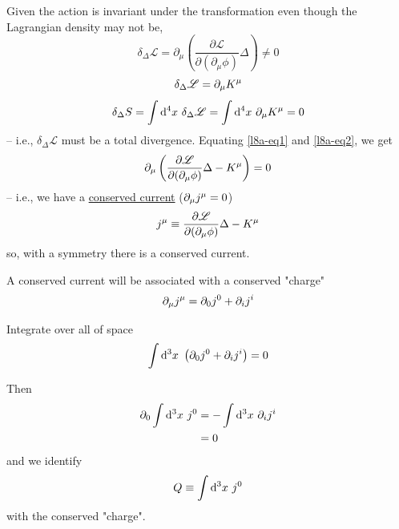 \documentclass{article}
\begin{document}
\noindent Given the action is invariant under the transformation even though the \linebreak Lagrangian density may not be,
\begin{equation} \label{l8a-eq1}
    \delta_\Delta \mathscr{L} = \partial_\mu \left( \dfrac{ \partial \mathscr{L} }{ \partial ( \partial_\mu \phi ) } \Delta \right) \neq 0
\end{equation} %
\begin{equation} \label{l8a-eq2}
    \delta_\Delta \mathscr{L} = \partial_\mu \tensor{K}{^\mu}
\end{equation} %
\begin{equation*}
    \delta_\Delta S = \int \mathrm{d}^4 x~ \delta_\Delta \mathscr{L} = \int \mathrm{d}^4 x~ \partial_\mu \tensor{K}{^\mu} = 0
\end{equation*}
-- i.e., $\delta_\Delta \mathscr{L}$ must be a total divergence. Equating \eqref{l8a-eq1} and \eqref{l8a-eq2}, we get
\begin{equation*}
    \partial_\mu \left( \dfrac{ \partial \mathscr{L} }{ \partial ( \partial_\mu \phi ) } \Delta - \tensor{K}{^\mu} \right) = 0
\end{equation*}
-- i.e., we have a \underline{conserved current} ($\partial_\mu \tensor{j}{^\mu} = 0$)
\begin{equation*}
    \tensor{j}{^\mu} \equiv \dfrac{ \partial \mathscr{L} }{ \partial ( \partial_\mu \phi ) } \Delta - \tensor{K}{^\mu}
\end{equation*}
so, with a symmetry there is a conserved current.



\noindent A conserved current will be associated with a conserved "charge"
\begin{equation*}
    \partial_\mu \tensor{j}{^\mu} = \partial_0 \tensor{j}{^0} + \partial_i \tensor{j}{^i}
\end{equation*}

\noindent Integrate over all of space
\begin{equation*}
    \int \mathrm{d}^3 x~ \left( \partial_0 \tensor{j}{^0} + \partial_i \tensor{j}{^i} \right) = 0
\end{equation*}

\noindent Then
\begin{align*}
    \partial_0 \int \mathrm{d}^3 x~ \tensor{j}{^0} &= - \int \mathrm{d}^3 x~ \partial_i \tensor{j}{^i} \\
    &= 0
\end{align*}
and we identify
\begin{equation*}
    Q \equiv \int \mathrm{d}^3 x~ \tensor{j}{^0}
\end{equation*}
with the conserved "charge".
\end{document}
